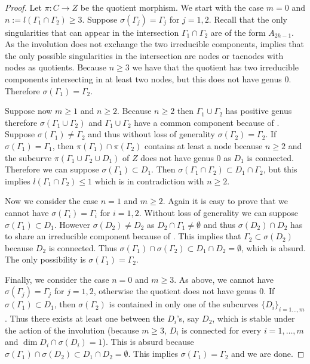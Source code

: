 \documentclass{alggeom}
\numberwithin{equation}{section}
\numberwithin{subsection}{section}
\theoremstyle{definition}
\theoremstyle{remark}
\begin{document}
\begin{proof}
	Let $\pi:C\rightarrow Z$ be the quotient morphism. We start with the case $m=0$ and $n:=l(\Gamma_1\cap \Gamma_2)\geq 3$. Suppose $\sigma(\Gamma_j)=\Gamma_j$ for $j=1,2$. Recall that the only singularities that can appear in the intersection $\Gamma_1\cap \Gamma_2$ are of the form $A_{2h-1}$. As the involution does not exchange the two irreducible components,  implies that the only possible singularities in the intersection are nodes or tacnodes with nodes as quotients. Because $n\geq 3$ we have that the quotient has two irreducible components intersecting in at least two nodes, but this does not have genus $0$. Therefore $\sigma(\Gamma_1)=\Gamma_2$.
	
	Suppose now $m\geq 1$ and $n\geq 2$. Because $n\geq 2$ then $\Gamma_1 \cup \Gamma_2$ has positive genus therefore $\sigma(\Gamma_1\cup\Gamma_2)$ and $\Gamma_1\cup\Gamma_2$ have a common component because of . Suppose $\sigma(\Gamma_1)\neq \Gamma_2$ and thus without loss of generality $\sigma(\Gamma_2)=\Gamma_2$. If $\sigma(\Gamma_1)=\Gamma_1$, then $\pi(\Gamma_1)\cap\pi(\Gamma_2)$ contains at least a node because $n\geq 2$ and the subcurve $\pi(\Gamma_1\cup\Gamma_2\cup D_1)$ of $Z$ does not have genus $0$ as $D_1$ is connected. Therefore we can suppose $\sigma(\Gamma_1)\subset D_1$. Then $\sigma(\Gamma_1\cap\Gamma_2)\subset D_1\cap\Gamma_2$, but this implies $l(\Gamma_1\cap\Gamma_2)\leq 1$ which is in contradiction with $n\geq 2$.
	
	Now we consider the case $n=1$ and $m\geq 2$. Again it is easy to prove that we cannot have $\sigma(\Gamma_i)=\Gamma_i$ for $i=1,2$. Without loss of generality we can suppose $\sigma(\Gamma_1)\subset D_1$. However $\sigma(D_2)\neq D_2$ as $D_2\cap \Gamma_1\neq \emptyset$ and thus $\sigma(D_2)\cap D_2$ has to share an irreducible component because of . This implies that $\Gamma_2 \subset \sigma(D_2)$ because $D_2$ is connected. Thus $\sigma(\Gamma_1)\cap\sigma(\Gamma_2)\subset D_1\cap D_2 = \emptyset$, which is absurd. The only possibility is $\sigma(\Gamma_1)=\Gamma_2$.
	
	Finally, we consider the case $n=0$ and $m\geq 3$. As above, we cannot have $\sigma(\Gamma_j)=\Gamma_j$ for $j=1,2$, otherwise the quotient does not have genus $0$. If $\sigma(\Gamma_1)\subset D_1$, then $\sigma(\Gamma_2)$ is contained in only one of the subcurves $\{D_i\}_{i=1\dots,m}$. Thus there exists at least one between the $D_i$'s, say $D_2$, which is stable under the action of the involution (because $m\geq 3$, $D_i$ is connected for every $i=1,\dots,m$ and $\dim D_i \cap \sigma(D_i) = 1$). This is absurd because $\sigma(\Gamma_1)\cap \sigma(D_2) \subset D_1\cap D_2=\emptyset$. This implies $\sigma(\Gamma_1)=\Gamma_2$ and we are done.
\end{proof}
\end{document}
